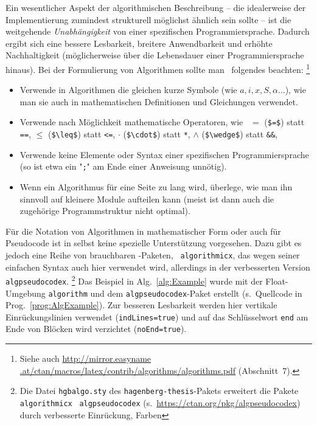 Ein wesentlicher Aspekt der algorithmischen Beschreibung -- die idealerweise
der Implementierung zumindest strukturell möglichst ähnlich sein sollte --
ist die weitgehende \emph{Unabhängigkeit} von einer spezifischen
Programmiersprache. Dadurch ergibt sich eine bessere Lesbarkeit, breitere
Anwendbarkeit und erhöhte Nachhaltigkeit (möglicherweise über die Lebensdauer
einer Programmiersprache hinaus). Bei der Formulierung von Algorithmen sollte
man \ua\ folgendes beachten:%
\footnote{Siehe auch \url{http://mirror.easyname
.at/ctan/macros/latex/contrib/algorithms/algorithms.pdf} (Abschnitt~7).}
%
\begin{itemize}
	\item
	Verwende in Algorithmen die gleichen kurze Symbole (wie $a, i, x, S,
	\alpha \ldots$), wie man sie auch in mathematischen Definitionen und
	Gleichungen verwendet.
	\item
	Verwende nach Möglichkeit mathematische Operatoren, wie \zB\
	$=$ (\verb!$=$!) statt \texttt{==},
	$\leq$ (\verb!$\leq$!) statt \texttt{<=},
	$\cdot$ (\verb!$\cdot$!) statt \texttt{*},
	$\wedge$ (\verb!$\wedge$!) statt \texttt{\&\&},
	\usw
	\item
	Verwende keine Elemente oder Syntax einer spezifischen Programmiersprache
	(so ist etwa ein "\texttt{;}" am Ende einer Anweisung unnötig).
	\item
	Wenn ein Algorithmus für eine Seite zu lang wird, überlege, wie man ihn
	sinnvoll auf kleinere Module aufteilen kann (meist ist dann auch die
	zugehörige Programmstruktur nicht optimal).
\end{itemize}


Für die Notation von Algorithmen in mathematischer Form oder auch für
Pseudo\-code ist in \latex selbst keine spezielle Unterstützung vorgesehen.
Dazu gibt es jedoch eine Reihe von brauchbaren \latex-Paketen, \ua\
\texttt{algorithmicx}, das wegen seiner einfachen Syntax auch hier verwendet
wird, allerdings in der verbesserten Version \texttt{algpseudocodex}.%
\footnote{Die Datei \nolinkurl{hgbalgo.sty} des
\texttt{hagenberg-thesis}-Pakets erweitert die Pakete \texttt{algorithmicx}
\bzw\ \texttt{algpseudocodex} (s.\ \url{https://ctan.org/pkg/algpseudocodex})
durch verbesserte Einrückung, Farben \etc}
%
Das Beispiel in Alg.~\ref{alg:Example} wurde mit der Float-Umgebung
\texttt{algorithm} und dem \texttt{algpseudocodex}-Paket erstellt (s.\
Quellcode in Prog.\ \ref{prog:AlgExample}). Zur besseren Lesbarkeit werden
hier vertikale Einrückungslinien verwendet (\texttt{indLines=true}) und auf
das Schlüsselwort \texttt{end} am Ende von Blöcken wird verzichtet
(\texttt{noEnd=true}).

